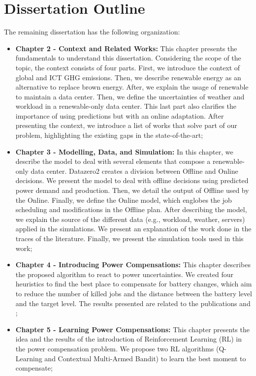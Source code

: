 \section{Dissertation Outline}
The remaining dissertation has the following organization:
\begin{itemize}
    \item[] \textbf{Chapter 2 - Context and Related Works:} This chapter presents the fundamentals to understand this dissertation. Considering the scope of the topic, the context consists of four parts. First, we introduce the context of global and ICT GHG emissions. Then, we describe renewable energy as an alternative to replace brown energy. After, we explain the usage of renewable to maintain a data center. Then, we define the uncertainties of weather and workload in a renewable-only data center. This last part also clarifies the importance of using predictions but with an online adaptation. After presenting the context, we introduce a list of works that solve part of our problem, highlighting the existing gaps in the state-of-the-art;
    \item[] \textbf{Chapter 3 - Modelling, Data, and Simulation:} In this chapter, we describe the model to deal with several elements that compose a renewable-only data center. Datazero2 creates a division between Offline and Online decisions. We present the model to deal with offline decisions using predicted power demand and production. Then, we detail the output of Offline used by the Online. Finally, we define the Online model, which englobes the job scheduling and modifications in the Offline plan. After describing the model, we explain the source of the different data (e.g., workload, weather, servers) applied in the simulations. We present an explanation of the work done in the traces of the literature. Finally, we present the simulation tools used in this work;
    \item[] \textbf{Chapter 4 - Introducing Power Compensations:} This chapter describes the proposed algorithm to react to power uncertainties. We created four heuristics to find the best place to compensate for battery changes, which aim to reduce the number of killed jobs and the distance between the battery level and the target level. The results presented are related to the publications \cite{de2022analyzing} and \cite{de2022mixing};
    \item[] \textbf{Chapter 5 - Learning Power Compensations:} This chapter presents the idea and the results of the introduction of Reinforcement Learning (RL) in the power compensation problem. We propose two RL algorithms (Q-Learning and Contextual Multi-Armed Bandit) to learn the best moment to compensate;

\end{itemize}
